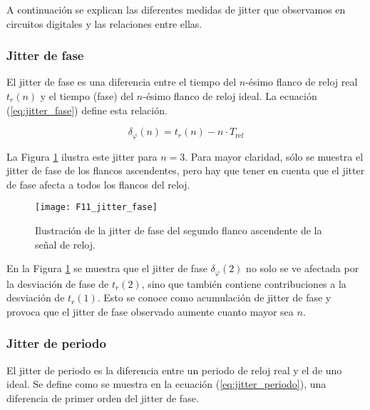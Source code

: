             A continuación se explican las diferentes medidas de jitter que observamos en circuitos digitales y las relaciones entre ellas.

            \subsubsection{Jitter de fase}

                El jitter de fase es una diferencia entre el tiempo del $n$-ésimo flanco de reloj real $t_{r}(n)$ y el tiempo (fase) del $n$-ésimo flanco de reloj ideal. La ecuación (\ref{eq:jitter_fase}) define esta relación.

                \begin{equation}
                    \delta_{\varphi}(n) = t_{r}(n) - n \cdot T_{\text{ref}}
                    \label{eq:jitter_fase}
                \end{equation}
                
                La Figura \ref{fig:F11_jitter_fase} ilustra este jitter para $n = 3$. Para mayor claridad, sólo se muestra el jitter de fase de los flancos ascendentes, pero hay que tener en cuenta que el jitter de fase afecta a todos los flancos del reloj.

                \begin{figure}[hbtp]
                    \centering
                    \texttt{[image: F11\_jitter\_fase]}
                    \caption{Ilustración de la jitter de fase del segundo flanco ascendente de la señal de reloj. \cite{Petura2019}}
                    \label{fig:F11_jitter_fase}
                \end{figure}

                En la Figura \ref{fig:F11_jitter_fase} se muestra que el jitter de fase $\delta_{\varphi}(2)$ no solo se ve afectada por la desviación de fase de $t_{r}(2)$, sino que también contiene contribuciones a la desviación de $t_{r}(1)$. Esto se conoce como acumulación de jitter de fase y provoca que el jitter de fase observado aumente cuanto mayor sea $n$.

            \subsubsection{Jitter de periodo}

                El jitter de periodo es la diferencia entre un periodo de reloj real y el de uno ideal. Se define como se muestra en la ecuación (\ref{eq:jitter_periodo}), una diferencia de primer orden del jitter de fase.

